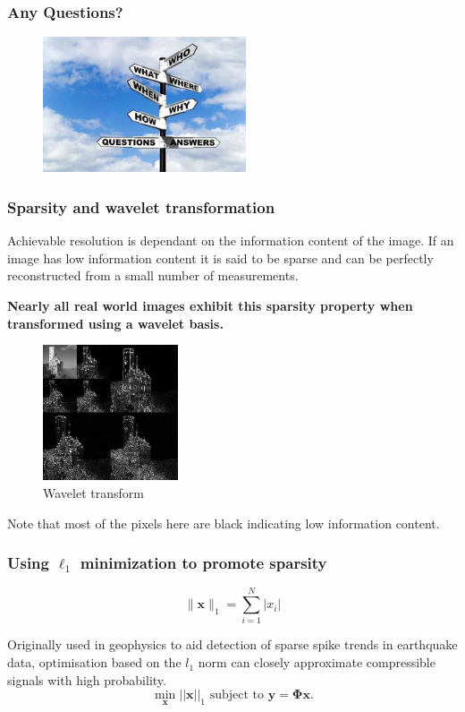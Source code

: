 \documentclass{beamer}
\begin{document}
  \begin{frame}
    \frametitle{Any Questions?}
      \begin{figure}[h]
  \centering
  \includegraphics[height=4cm]{questions.jpg}
 \end{figure} 
  \end{frame}

\begin{frame}
  \frametitle{Sparsity and wavelet transformation}
Achievable resolution is dependant on the information content of the image. If an image has low information content  it is said to be sparse and can be perfectly reconstructed from a small number of measurements. 

\bf{Nearly all real world images exhibit this sparsity property when transformed using a wavelet basis.}

  \begin{figure}[h]
    \centering
    \includegraphics[height = 4cm]{wavelets}
    \caption{Wavelet transform}
    \label{fig:wavelet}
  \end{figure}

Note that most of the pixels here are black indicating low information content.
 \end{frame}


\begin{frame}
  \frametitle{Using $\ell_1$ minimization to promote sparsity}
\label{l1}

\begin{equation*}
\label{eq:57}
  \|\boldsymbol{x}\|_1 = \sum_{i=1}^{N}|x_i|
\end{equation*}

Originally used in geophysics to aid detection of sparse spike trends in earthquake data, optimisation based on the $l_1$ norm can closely approximate compressible signals with high probability.  
\begin{equation*}
  \label{eq:4}
  \min_{\boldsymbol{x}} ||\boldsymbol{x}||_1 \text{ subject to } \boldsymbol{y} = \boldsymbol{\Phi} \boldsymbol{x}.
\end{equation*}
\hyperlink{recovery}{}

\end{frame}
\end{document}
